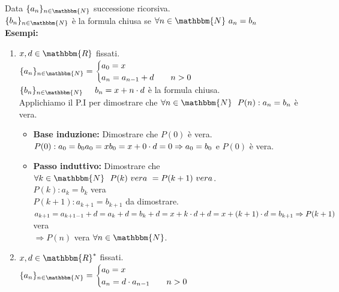 \documentclass[12pt, letterpaper]{report}
\begin{document}
 		Data $\{a_n\}_{n \in \mathbbm{N}}$ successione ricorsiva. \\
 		$\{b_n\}_{n \in \mathbbm{N}}$ è la formula chiusa se $\forall n \in \mathbbm{N} \ a_n = b_n$
 		\\
 		\textbf{Esempi: }
 		\begin{enumerate}
 			\item $x,d \in \mathbbm{R}$ fissati. \\
 			$\{a_n\}_{n \in \mathbbm{N}} = \begin{cases}
 				a_0 = x \\
 				a_n = a_{n - 1} + d \hspace{0.7cm} n > 0
 			\end{cases}$
 			\\
 			$\{b_n\}_{n \in \mathbbm{N}} \hspace{0.5cm} b_n = x + n \cdot d$ è la formula chiusa.
 			\\
 			Applichiamo il P.I per dimostrare che $\forall n \in \mathbbm{N} \ \ P(n):a_n = b_n$ è vera.
 			\begin{itemize}
 				\item \textbf{Base induzione:} Dimostrare che $P(0)$ è vera. \\
 				$P(0): a_0 = b_0 \\ a_0 = x \\ b_0 = x + 0 \cdot d = 0 \\ \Rightarrow a_0 = b_0$ e $P(0)$ è vera.
 				\item \textbf{Passo induttivo:} Dimostrare che $\forall k \in \mathbbm{N} \ \ P(k) \ vera \ = P(k + 1) \ vera$. \\
 				$P(k): a_k = b_k$ vera \\ $P(k+1): a_{k + 1} = b_{k + 1}$ da dimostrare.
 				\\
 				$a_{k + 1} = a_{k + 1 - 1} + d = a_k + d = b_k + d = x + k \cdot d + d = x + (k + 1) \cdot d = b_{k + 1} \\ \Rightarrow P(k + 1)$ vera \\
 				$\Rightarrow P(n)$ vera $\forall n \in \mathbbm{N}$.
 			\end{itemize}
 			\item $x,d \in \mathbbm{R}^*$ fissati.
 			\\
 			$\{a_n\}_{n \in \mathbbm{N}} = \begin{cases}
 				a_0 = x \\
 				a_n = d \cdot a_{n - 1} \hspace{0.7cm} n > 0
 			\end{cases}$

\end{enumerate}
\end{document}
